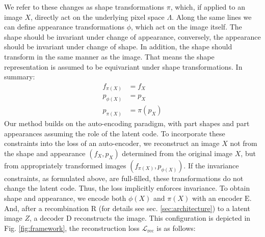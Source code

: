 	We refer to these changes as shape transformations $\pi$, which, if applied to an image $X$, directly act on the underlying pixel space $\Lambda$.
	Along the same lines we can define appearance transformations $\phi$, which act on the image itself.
	The shape should be invariant under change of appearance, conversely, the appearance should be invariant under change of shape.
	In addition, the shape should transform in the same manner as the image.
	That means the shape representation is assumed to be equivariant under shape transformations.
	In summary:
	\begin{align}
		f_{\pi(X)}  &= f_{X} \tag{invariance of appearance}\\
		p_{\phi(X)} &= p_X  \tag{invariance of shape}\\
		p_{\pi(X)} &= \pi(p_X) \tag{equivariance of shape}
	\label{eq:invar}
	\end{align} %
	Our method builds on the auto-encoding paradigm, with part shapes and part appearances assuming the role of the latent code.
	To incorporate these constraints into the loss of an auto-encoder, we reconstruct an image $X$ not from the shape and appearance $(f_X, p_X)$ determined from the original image $X$, but from appropriately transformed images $(f_{\pi(X)}, p_{\phi(X)})$.
	If the invariance constraints, as formulated above, are full-filled, these transformations do not change the latent code.
	Thus, the loss implicitly enforces invariance.
	To obtain shape and appearance, we encode both $\phi(X)$ and $\pi(X)$ with an encoder $\mathrm{E}$.
	And, after a recombination $\mathrm{R}$ (for details see sec. \ref{sec:architecture}) to a latent image $Z$, a decoder $\mathrm{D}$ reconstructs the image.
	This configuration is depicted in Fig. \ref{fig:framework}, the reconstruction loss $\mathcal{L}_{\textrm{rec}}$ is as follows:
